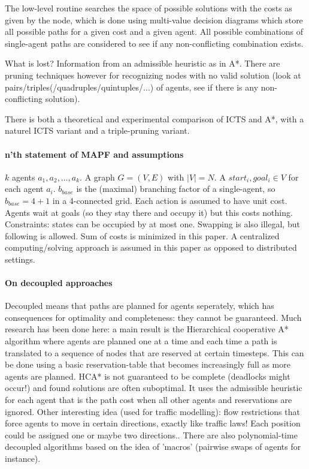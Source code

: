 \documentclass[a4paper,10pt,english]{article}
\begin{document}
    The low-level routine searches the space of possible solutions with the costs as given by the node, which is done using multi-value decision diagrams which store all possible paths for a given cost and a given agent. All possible combinations of single-agent paths are considered to see if any non-conflicting combination exists.
    
    What is lost? Information from an admissible heuristic as in A*. There are pruning techniques however for recognizing nodes with no valid solution (look at pairs/triples(/quadruples/quintuples/...) of agents, see if there is any non-conflicting solution).
    
    There is both a theoretical and experimental comparison of ICTS and A*, with a naturel ICTS variant and a triple-pruning variant.
    \paragraph{n'th statement of MAPF and assumptions}
    $k$ agents $a_1,a_2,\ldots,a_k$. A graph $G = (V,E)$ with $|V| = N$. A $start_i,goal_i\in V$ for each agent $a_i$. $b_{base}$ is the (maximal) branching factor of a single-agent, so $b_{base} = 4+1$ in a 4-connected grid. Each action is assumed to have unit cost. Agents wait at goals (so they stay there and occupy it) but this costs nothing. Constraints: states can be occupied by at most one. Swapping is also illegal, but following is allowed. Sum of costs is minimized in this paper. A centralized computing/solving approach is assumed in this paper as opposed to distributed settings.
    \paragraph{On decoupled approaches}
	Decoupled means that paths are planned for agents seperately, which has consequences for optimality and completeness: they cannot be guaranteed. Much research has been done here: a main result is the Hierarchical cooperative A* algorithm where agents are planned one at a time and each time a path is translated to a sequence of nodes that are reserved at certain timesteps\cite{silver2005}. This can be done using a basic reservation-table that becomes increasingly full as more agents are planned. HCA* is not guaranteed to be complete (deadlocks might occur!) and found solutions are often suboptimal. It uses the admissible heuristic for each agent that is the path cost when all other agents and reservations are ignored. Other interesting idea (used for traffic modelling): flow restrictions that force agents to move in certain directions, exactly like traffic laws! Each position could be assigned one or maybe two directions.. There are also polynomial-time decoupled algorithms based on the idea of 'macros' (pairwise swaps of agents for instance).
	
\end{document}
